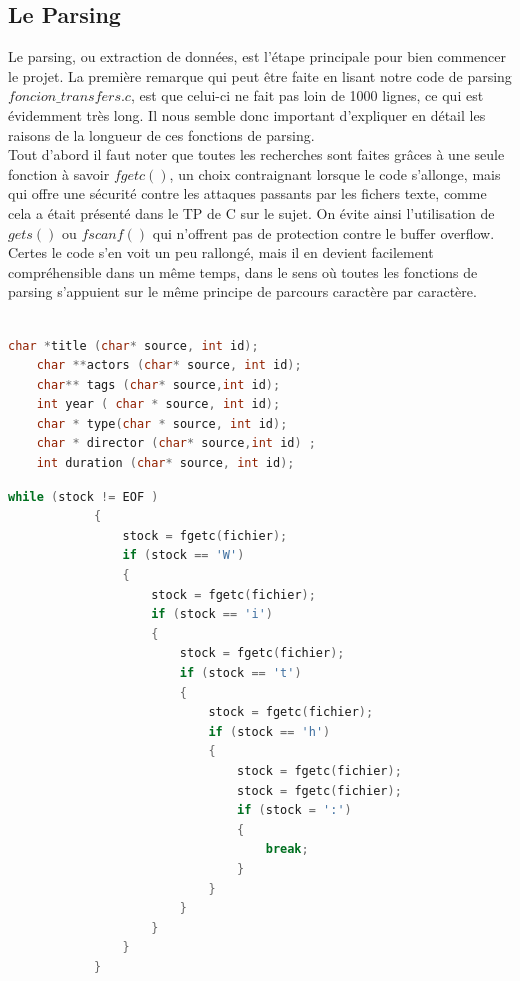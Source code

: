 \documentclass[light]{ceri}
\begin{document}
\subsection{Le Parsing}
Le parsing, ou extraction de données, est l'étape principale pour bien commencer le projet.
La première remarque qui peut être faite en lisant notre code de parsing \begin{math}foncion\_transfers.c \end{math}, est que celui-ci ne fait pas loin de 1000 lignes, ce qui est évidemment très long. Il nous semble donc important d'expliquer en détail les raisons de la longueur de ces fonctions de parsing.\\
\indent Tout d'abord il faut noter que toutes les recherches sont faites grâces à une seule fonction à savoir \begin{math} fgetc()\end{math}, un choix contraignant lorsque le code s'allonge, mais qui offre une sécurité contre les attaques passants par les fichers texte, comme cela a était présenté dans le TP de C sur le sujet. On évite ainsi l'utilisation de \begin{math} gets() \end{math} ou \begin{math} fscanf() \end{math} qui n'offrent pas de protection contre le buffer overflow\cite{bufferSecurity}. \\
\indent Certes le code s'en voit un peu rallongé, mais il en devient facilement compréhensible dans un même temps, dans le sens où toutes les fonctions de parsing  s'appuient sur le même principe de parcours caractère par caractère.  \\
\\

    \begin{lstlisting}[language=c]
    char *title (char* source, int id);
    char **actors (char* source, int id);
    char** tags (char* source,int id);
    int year ( char * source, int id);
    char * type(char * source, int id);
    char * director (char* source,int id) ;
    int duration (char* source, int id);
    \end{lstlisting}

    \begin{lstlisting}[language=c]
 		while (stock != EOF )
 			{
 				stock = fgetc(fichier);	
 				if (stock == 'W')
 				{
 					stock = fgetc(fichier);	
 					if (stock == 'i')
 					{
 						stock = fgetc(fichier);	
 						if (stock == 't')
 						{
 							stock = fgetc(fichier);
 							if (stock == 'h')
 							{
 								stock = fgetc(fichier);
 								stock = fgetc(fichier);
 								if (stock = ':')
 								{
 									break;
 								}
 							}
 						}
 					}
 				}
 			}
    \end{lstlisting}
\end{document}
